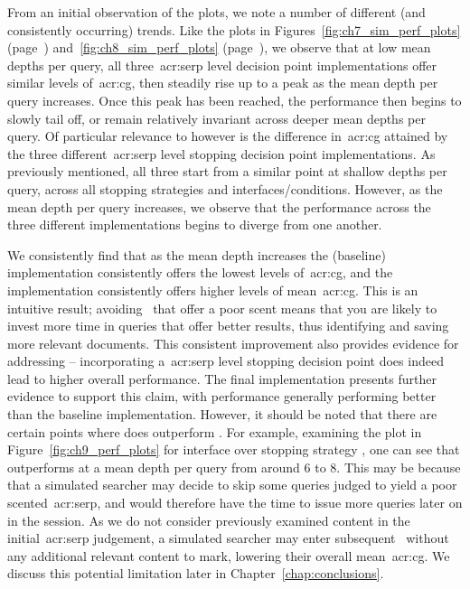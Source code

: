 From an initial observation of the plots, we note a number of different (and consistently occurring) trends. Like the plots in Figures~\ref{fig:ch7_sim_perf_plots} (page~\pageref{fig:ch7_sim_perf_plots}) and~\ref{fig:ch8_sim_perf_plots} (page~\pageref{fig:ch8_sim_perf_plots}), we observe that at low mean depths per query, all three~\gls{acr:serp} level decision point implementations offer similar levels of~\gls{acr:cg}, then steadily rise up to a peak as the mean depth per query increases. Once this peak has been reached, the performance then begins to slowly tail off, or remain relatively invariant across deeper mean depths per query. Of particular relevance to  however is the difference in~\gls{acr:cg} attained by the three different~\gls{acr:serp} level stopping decision point implementations. As previously mentioned, all three start from a similar point at shallow depths per query, across all stopping strategies and interfaces/conditions. However, as the mean depth per query increases, we observe that the performance across the three different implementations begins to diverge from one another.

We consistently find that as the mean depth increases the  (baseline) implementation consistently offers the lowest levels of~\gls{acr:cg}, and the  implementation consistently offers higher levels of mean~\gls{acr:cg}. This is an intuitive result; avoiding~ that offer a poor scent means that you are likely to invest more time in queries that offer better results, thus identifying and saving more relevant documents. This consistent improvement also provides evidence for addressing  -- incorporating a~\gls{acr:serp} level stopping decision point does indeed lead to higher overall performance. The final implementation  presents further evidence to support this claim, with performance generally performing better than the baseline  implementation. However, it should be noted that there are certain points where  does outperform . For example, examining the plot in Figure~\ref{fig:ch9_perf_plots} for interface  over stopping strategy , one can see that  outperforms  at a mean depth per query from around $6$ to $8$. This may be because that a simulated searcher may decide to skip some queries judged to yield a poor scented~\gls{acr:serp}, and would therefore have the time to issue more queries later on in the session. As we do not consider previously examined content in the initial~\gls{acr:serp} judgement, a simulated searcher may enter subsequent~ without any additional relevant content to mark, lowering their overall mean~\gls{acr:cg}. We discuss this potential limitation later in Chapter~\ref{chap:conclusions}.


